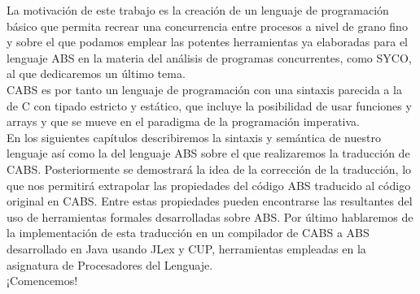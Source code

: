 La motivación de este trabajo es la creación de un lenguaje de programación básico que permita recrear una concurrencia entre procesos a nivel de grano fino y sobre el que podamos emplear las potentes herramientas ya elaboradas para el lenguaje ABS en la materia del análisis de programas concurrentes, como SYCO, al que dedicaremos un último tema.\\

CABS es por tanto un lenguaje de programación con una sintaxis parecida a la de C con tipado estricto y estático, que incluye la posibilidad de usar funciones y arrays y que se mueve en el paradigma de la programación imperativa.\\

En los siguientes capítulos describiremos la sintaxis y semántica de nuestro lenguaje así como la del lenguaje ABS sobre el que realizaremos la traducción de CABS. Posteriormente se demostrará la idea de la corrección de la traducción, lo que nos permitirá extrapolar las propiedades del código ABS traducido al código original en CABS. Entre estas propiedades pueden encontrarse las resultantes del uso de herramientas formales desarrolladas sobre ABS. Por último hablaremos de la implementación de esta traducción en un compilador de CABS a ABS desarrollado en Java usando JLex y CUP, herramientas empleadas en la asignatura de Procesadores del Lenguaje.\\

¡Comencemos!
